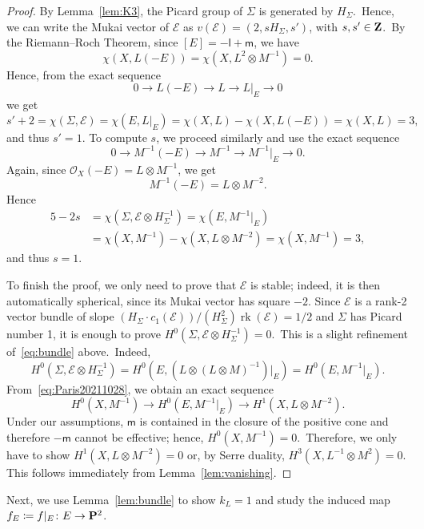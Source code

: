 \documentclass[12pt]{amsart}
\def\cO{\mathscr{O}}
\def\cE{\mathscr{E}}
\def\Z{{\bf Z}}
\def\P{{\bf P}}
\def\otp{}
\DeclareMathOperator{\rk}{rk}
\def\ot{\otimes}
\theoremstyle{remark}
\def\lll{\ensuremath{\mathsf l}}
\def\mm{\ensuremath{\mathsf m}}
\begin{document}
\begin{proof}
By Lemma~\ref{lem:K3}, the Picard group of $\Sigma$ is generated by $H_\Sigma$.\
Hence, we can write  the Mukai vector of $\cE$ as $v(\cE)=(2,s H_\Sigma, s')$, with $s,s'\in\Z$.\
By the Riemann--Roch Theorem, since $[E]=-\lll+\mm$, we have
\[
\chi(X,L (-E))=\chi(X,L^{\otp 2}\otimes M^{-1})=0.
\]
Hence, from the exact sequence
\begin{equation}\label{eq:Paris20211029}
0\to L (-E) \to L \to L \vert_E \to 0
\end{equation}
we get
\[
s'+2 = \chi(\Sigma,\cE) = \chi(E,L \vert_E) = \chi(X,L) - \chi(X,L (-E)) = \chi(X,L) = 3,
\]
and thus $s'=1$.
To compute $s$, we proceed similarly and use the exact sequence
\begin{equation}\label{eq:Paris20211028}
0\to M^{-1}  (-E) \to M^{-1} \to M^{-1} \vert_E \to 0.
\end{equation}
Again, since $\cO_X(-E)=L \otimes M^{-1}$, we get
\[
M^{-1} (-E) = L\otimes M^{-2}.
\]
Hence
\begin{equation}\label{eq:bundle}
\begin{split}
5 - 2s & = \chi(\Sigma,\cE \otimes H_\Sigma^{-1}) = \chi(E,M^{-1} \vert_E) \\
& = \chi(X,M^{-1}) - \chi(X,L\otimes M^{-2}) = \chi(X,M^{-1}) = 3,
\end{split}
\end{equation}
and thus $s=1$.

To finish the proof, we only need to prove that $\cE$ is stable; indeed, it is then automatically spherical, since its Mukai vector has square  $-2$.
Since $\cE$ is a rank-2 vector bundle of slope $(H_\Sigma\cdot c_1(\cE))/(H_\Sigma^2)\rk(\cE)=1/2$ and $\Sigma$ has Picard number 1, it is enough to prove   \mbox{$H^0(\Sigma,\cE\otimes H_\Sigma^{-1})=0$.}\
This is a slight refinement of~\eqref{eq:bundle} above.\
Indeed,
\[
H^0(\Sigma,\cE\otimes H_\Sigma^{-1})=H^0(E,(L\otimes (L\otimes M)^{-1})\vert_E)=H^0(E,M^{-1} \vert_E).
\]
From~\eqref{eq:Paris20211028}, we obtain an exact sequence
\[
H^0(X,M^{-1}) \to H^0(E,M^{-1} \vert_E) \to H^1(X,L\otimes M^{-2}).
\]
Under our assumptions, $\mm$ is contained in the closure of the positive cone and therefore $-\mm$ cannot be effective; hence, $H^0(X,M^{-1})=0$.\
Therefore, we only have to show  $H^1(X,L\otimes M^{-2})=0$ or, by Serre duality,  $H^3(X,  L^{-1}\ot M^{\otp 2})=0$.
This follows immediately from Lemma~\ref{lem:vanishing}.
\end{proof}

Next, we use Lemma~\ref{lem:bundle} to show $k_L=1$ and study the induced map $f_E\coloneqq f \vert_E \colon E\to \P^2$.
\end{document}
